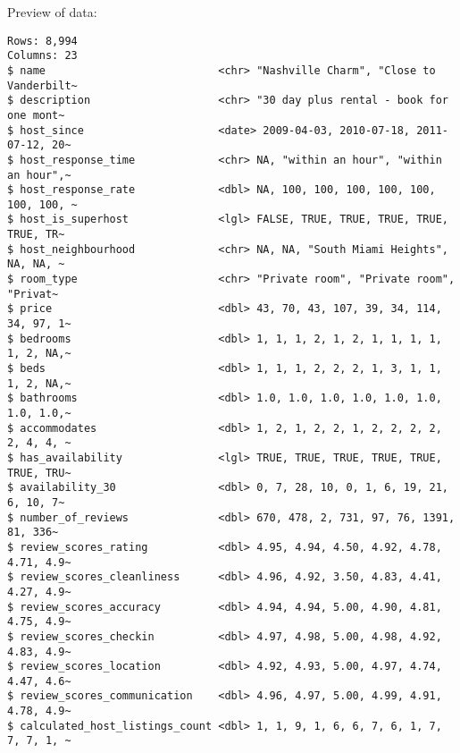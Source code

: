\documentclass[12pt]{article}
\begin{document}
Preview of data:

\begin{verbatim}
Rows: 8,994
Columns: 23
$ name                           <chr> "Nashville Charm", "Close to Vanderbilt~
$ description                    <chr> "30 day plus rental - book for one mont~
$ host_since                     <date> 2009-04-03, 2010-07-18, 2011-07-12, 20~
$ host_response_time             <chr> NA, "within an hour", "within an hour",~
$ host_response_rate             <dbl> NA, 100, 100, 100, 100, 100, 100, 100, ~
$ host_is_superhost              <lgl> FALSE, TRUE, TRUE, TRUE, TRUE, TRUE, TR~
$ host_neighbourhood             <chr> NA, NA, "South Miami Heights", NA, NA, ~
$ room_type                      <chr> "Private room", "Private room", "Privat~
$ price                          <dbl> 43, 70, 43, 107, 39, 34, 114, 34, 97, 1~
$ bedrooms                       <dbl> 1, 1, 1, 2, 1, 2, 1, 1, 1, 1, 1, 2, NA,~
$ beds                           <dbl> 1, 1, 1, 2, 2, 2, 1, 3, 1, 1, 1, 2, NA,~
$ bathrooms                      <dbl> 1.0, 1.0, 1.0, 1.0, 1.0, 1.0, 1.0, 1.0,~
$ accommodates                   <dbl> 1, 2, 1, 2, 2, 1, 2, 2, 2, 2, 2, 4, 4, ~
$ has_availability               <lgl> TRUE, TRUE, TRUE, TRUE, TRUE, TRUE, TRU~
$ availability_30                <dbl> 0, 7, 28, 10, 0, 1, 6, 19, 21, 6, 10, 7~
$ number_of_reviews              <dbl> 670, 478, 2, 731, 97, 76, 1391, 81, 336~
$ review_scores_rating           <dbl> 4.95, 4.94, 4.50, 4.92, 4.78, 4.71, 4.9~
$ review_scores_cleanliness      <dbl> 4.96, 4.92, 3.50, 4.83, 4.41, 4.27, 4.9~
$ review_scores_accuracy         <dbl> 4.94, 4.94, 5.00, 4.90, 4.81, 4.75, 4.9~
$ review_scores_checkin          <dbl> 4.97, 4.98, 5.00, 4.98, 4.92, 4.83, 4.9~
$ review_scores_location         <dbl> 4.92, 4.93, 5.00, 4.97, 4.74, 4.47, 4.6~
$ review_scores_communication    <dbl> 4.96, 4.97, 5.00, 4.99, 4.91, 4.78, 4.9~
$ calculated_host_listings_count <dbl> 1, 1, 9, 1, 6, 6, 7, 6, 1, 7, 7, 7, 1, ~
\end{verbatim}
\end{document}
